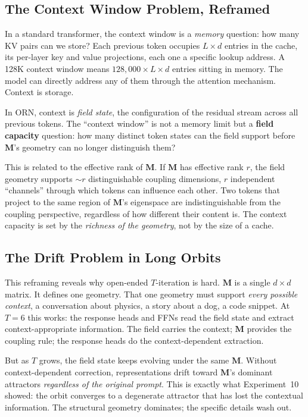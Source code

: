 \documentclass[11pt, a4paper]{article}
\newcommand{\M}{\mathbf{M}}
\theoremstyle{plain}
\theoremstyle{definition}
\theoremstyle{remark}
\begin{document}
\subsection{The Context Window Problem, Reframed}

In a standard transformer, the context window is a \emph{memory} question: how many KV pairs can we store?
Each previous token occupies $L \times d$ entries in the cache, its per-layer key and value projections, each one a specific lookup address.
A 128K context window means $128{,}000 \times L \times d$ entries sitting in memory.
The model can directly address any of them through the attention mechanism.
Context is storage.

In ORN, context is \emph{field state}, the configuration of the residual stream across all previous tokens.
The ``context window'' is not a memory limit but a \textbf{field capacity} question: how many distinct token states can the field support before $\M$'s geometry can no longer distinguish them?

This is related to the effective rank of $\M$.
If $\M$ has effective rank $r$, the field geometry supports ${\sim}r$ distinguishable coupling dimensions, $r$ independent ``channels'' through which tokens can influence each other.
Two tokens that project to the same region of $\M$'s eigenspace are indistinguishable from the coupling perspective, regardless of how different their content is.
The context capacity is set by the \emph{richness of the geometry}, not by the size of a cache.

\subsection{The Drift Problem in Long Orbits}

This reframing reveals why open-ended $T$-iteration is hard.
$\M$ is a single $d \times d$ matrix.
It defines one geometry.
That one geometry must support \emph{every possible context}, a conversation about physics, a story about a dog, a code snippet.
At $T{=}6$ this works: the response heads and FFNs read the field state and extract context-appropriate information.
The field carries the context; $\M$ provides the coupling rule; the response heads do the context-dependent extraction.

But as $T$ grows, the field state keeps evolving under the same $\M$.
Without context-dependent correction, representations drift toward $\M$'s dominant attractors \emph{regardless of the original prompt}.
This is exactly what Experiment~10 showed: the orbit converges to a degenerate attractor that has lost the contextual information.
The structural geometry dominates; the specific details wash out.
\end{document}
